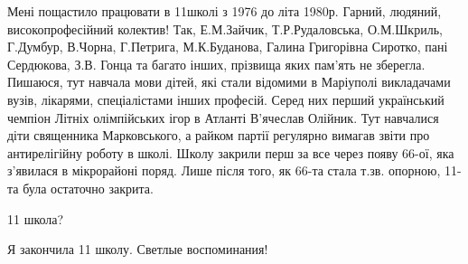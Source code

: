 
Мені пощастило працювати в 11школі з 1976 до літа 1980р. Гарний, людяний,
високопрофесійний колектив! Так, Е.М.Зайчик, Т.Р.Рудаловська, О.М.Шкриль,
Г.Думбур, В.Чорна, Г.Петрига, М.К.Буданова, Галина Григорівна Сиротко, пані
Сердюкова, З.В. Гонца та багато інших, прізвища яких пам'ять не зберегла.
Пишаюся, тут навчала мови дітей, які стали відомими в Маріуполі викладачами
вузів, лікарями, спеціалістами інших професій. Серед них перший український
чемпіон Літніх олімпійських ігор в Атланті В'ячеслав Олійник. Тут навчалися
діти священника Марковського, а райком партії регулярно вимагав звіти про
антирелігійну роботу в школі. Школу закрили перш за все через появу 66-ої, яка
з'явилася в мікрорайоні поряд. Лише після того, як 66-та стала т.зв. опорною,
11-та була остаточно закрита.


11 школа?


Я закончила 11 школу. Светлые воспоминания!

